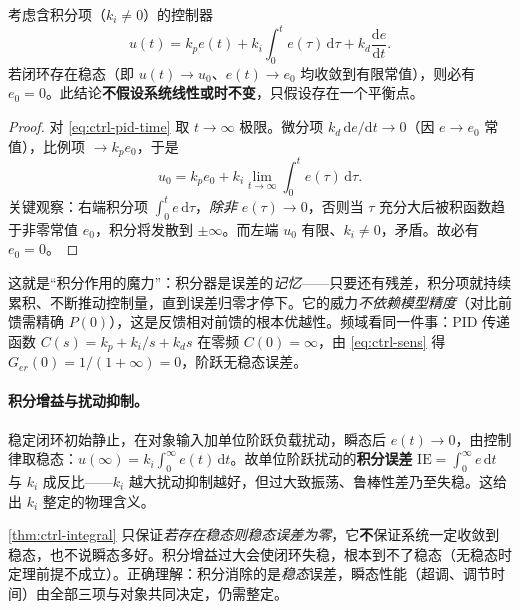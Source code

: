 \begin{theorem}[积分作用消除稳态误差]
\label{thm:ctrl-integral}
考虑含积分项（$k_i\neq0$）的控制器
\begin{equation}
  u(t)=k_pe(t)+k_i\int_0^t e(\tau)\,\mathrm d\tau+k_d\frac{\mathrm de}{\mathrm dt}.
  \label{eq:ctrl-pid-time}
\end{equation}
若闭环存在稳态（即 $u(t)\to u_0$、$e(t)\to e_0$ 均收敛到有限常值），则必有 $e_0=0$。此结论\textbf{不假设系统线性或时不变}，只假设存在一个平衡点。
\end{theorem}
\begin{proof}
对 \cref{eq:ctrl-pid-time} 取 $t\to\infty$ 极限。微分项 $k_d\,\mathrm de/\mathrm dt\to0$（因 $e\to e_0$ 常值），比例项 $\to k_pe_0$，于是
\begin{equation}
  u_0=k_pe_0+k_i\lim_{t\to\infty}\int_0^t e(\tau)\,\mathrm d\tau.
  \label{eq:ctrl-integral-limit}
\end{equation}
关键观察：右端积分项 $\int_0^t e\,\mathrm d\tau$，\emph{除非} $e(\tau)\to0$，否则当 $\tau$ 充分大后被积函数趋于非零常值 $e_0$，积分将发散到 $\pm\infty$。而左端 $u_0$ 有限、$k_i\neq0$，矛盾。故必有 $e_0=0$。
\end{proof}

\begin{insight}
这就是“积分作用的魔力”：积分器是误差的\emph{记忆}——只要还有残差，积分项就持续累积、不断推动控制量，直到误差归零才停下。它的威力\emph{不依赖模型精度}（对比前馈需精确 $P(0)$），这是反馈相对前馈的根本优越性。频域看同一件事：PID 传递函数 $C(s)=k_p+k_i/s+k_ds$ 在零频 $C(0)=\infty$，由 \cref{eq:ctrl-sens} 得 $G_{er}(0)=1/(1+\infty)=0$，阶跃无稳态误差。
\end{insight}

\paragraph{积分增益与扰动抑制。}
稳定闭环初始静止，在对象输入加单位阶跃负载扰动，瞬态后 $e(t)\to0$，由控制律取稳态\cite{astrom2008feedback}：$u(\infty)=k_i\int_0^\infty e(t)\,\mathrm dt$。故单位阶跃扰动的\textbf{积分误差} $\mathrm{IE}=\int_0^\infty e\,\mathrm dt$ 与 $k_i$ 成反比——$k_i$ 越大扰动抑制越好，但过大致振荡、鲁棒性差乃至失稳。这给出 $k_i$ 整定的物理含义。

\begin{pitfall}
\cref{thm:ctrl-integral} 只保证\emph{若存在稳态则稳态误差为零}，它\textbf{不}保证系统一定收敛到稳态，也不说瞬态多好。积分增益过大会使闭环失稳，根本到不了稳态（无稳态时定理前提不成立）。正确理解：积分消除的是\emph{稳态}误差，瞬态性能（超调、调节时间）由全部三项与对象共同决定，仍需整定。
\end{pitfall}

